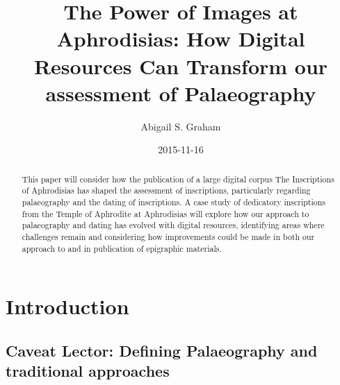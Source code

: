 \documentclass[amsthm,ebook]{saparticle}
\title{The Power of Images at Aphrodisias: 
How Digital Resources Can Transform our assessment of Palaeography}
\author[war]{Abigail S. Graham\corref{first}}
\date{2015-11-16}
\begin{document}
 \maketitle
\begin{abstract}
This paper will consider how the publication of a large digital corpus The Inscriptions of Aphrodisias \citet{ReynoldsRouecheBodard2007} has shaped the assessment of inscriptions, particularly regarding palaeography and the dating
of inscriptions. A case study of dedicatory inscriptions from the Temple of Aphrodite at Aphrodisias will explore how
our approach to palaeography and dating has evolved with digital resources, identifying areas where challenges remain
and considering how improvements could be made in both our approach to and in publication of epigraphic materials. 

\end{abstract}


\section{Introduction}
\subsection{Caveat Lector: Defining Palaeography and traditional approaches}
\end{document}
